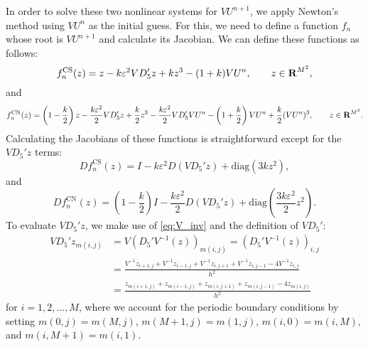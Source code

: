 \documentclass{article}
\begin{document}
	In order to solve these two nonlinear systems for $VU^{n+1}$, we apply Newton's method using $VU^n$ as the initial guess. For this, we need to define a function $f_n$ whose root is $VU^{n+1}$ and calculate its Jacobian. We can define these functions as follows:
	\begin{equation}
		f^\text{CS}_n(z) = z - k\varepsilon^2VD_5'z + kz^3 - (1+k)VU^n,  \qquad z \in \textnormal{\bf R}^{M^2},
	\end{equation}
	and
	\begin{equation}
		f^\text{CN}_n(z) = \left(1-\frac{k}{2}\right)z - \frac{k\varepsilon^2}{2}VD_5'z + \frac{k}{2}z^3 - \frac{k\varepsilon^2}{2}VD_5'VU^n -\left(1+\frac{k}{2}\right)VU^n + \frac{k}{2}(VU^n)^3, \qquad z \in \textnormal{\bf R}^{M^2}.
	\end{equation}
	Calculating the Jacobians of these functions is straightforward except for the $VD_5'z$ terms:
	\begin{equation}
		Df^\text{CS}_n(z) = I - k\varepsilon^2D(VD_5'z) + \mathrm{diag}(3kz^2),
	\end{equation}
	and
	\begin{equation}
		Df^\text{CN}_n(z) = \left(1-\frac{k}{2}\right)I - \frac{k\varepsilon^2}{2}D(VD_5'z) + \mathrm{diag}\left(\frac{3k\varepsilon^2}{2}z^2\right).
	\end{equation}
	To evaluate $VD_5'z$, we make use of \eqref{eq:V_inv} and the definition of $VD_5'$:
	\begin{align}
		VD_5'z_{m(i,j)} &= V(D_5'V^{-1}(z))_{m(i,j)} = (D_5'V^{-1}(z))_{i,j} \\
		&= \frac{V^{-1}z_{i+1,j} + V^{-1}z_{i-1,j} + V^{-1}z_{i,j+1} +V^{-1}z_{i,j-1} - 4V^{-1}z_{i,j}}{h^2} \\
		&= \frac{z_{m(i+1,j)} + z_{m(i-1,j)} + z_{m(i,j+1)} + z_{m(i,j-1)} - 4z_{m(i,j)}}{h^2}
	\end{align}
	for $i = 1,2,\dots, M$, where we account for the periodic boundary conditions by setting $m(0,j) = m(M,j)$, $m(M+1,j) = m(1,j)$, $m(i,0) = m(i,M)$, and $m(i,M+1) = m(i,1)$.
	
\end{document}
